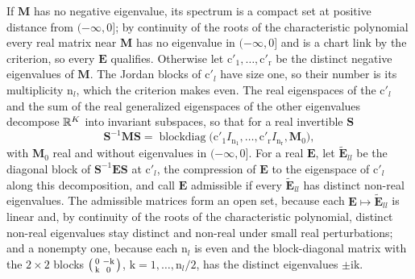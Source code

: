 If \(\mathbf M\) has no negative eigenvalue, its spectrum is a compact set at positive distance from
\((-\infty,0]\); by continuity of the roots of the characteristic polynomial every real matrix near
\(\mathbf M\) has no eigenvalue in \((-\infty,0]\) and is a chart link by the criterion, so every
\(\mathbf E\) qualifies. Otherwise let \(\mathrm c'_1,\ldots,\mathrm c'_{\mathrm r}\) be the distinct negative
eigenvalues of \(\mathbf M\). The Jordan blocks of \(\mathrm c'_l\) have size one, so their number is its
multiplicity \(\mathrm n_l\), which the criterion makes even. The real eigenspaces of the \(\mathrm c'_l\) and
the sum of the real generalized eigenspaces of the other eigenvalues decompose \(\mathbb R^K\) into invariant
subspaces, so that for a real invertible \(\mathbf S\)
\[
\mathbf S^{-1}\mathbf M\mathbf S=\operatorname{blockdiag}\bigl(\mathrm c'_1I_{\mathrm n_1},\ldots,\mathrm c'_{\mathrm r}I_{\mathrm n_{\mathrm r}},\mathbf M_0\bigr),
\]
with \(\mathbf M_0\) real and without eigenvalues in \((-\infty,0]\). For a real \(\mathbf E\), let
\(\widetilde{\mathbf E}_{ll}\) be the diagonal block of \(\mathbf S^{-1}\mathbf E\mathbf S\) at \(\mathrm c'_l\), the
compression of \(\mathbf E\) to the eigenspace of \(\mathrm c'_l\) along this decomposition, and call
\(\mathbf E\) admissible if every \(\widetilde{\mathbf E}_{ll}\) has distinct non-real eigenvalues. The
admissible matrices form an open set, because each \(\mathbf E\mapsto\widetilde{\mathbf E}_{ll}\) is linear
and, by continuity of the roots of the characteristic polynomial, distinct non-real eigenvalues stay
distinct and non-real under small real perturbations; and a nonempty one, because each \(\mathrm n_l\) is
even and the block-diagonal matrix with the \(2\times2\) blocks
\(\begin{psmallmatrix}0&-\mathrm k\\\mathrm k&0\end{psmallmatrix}\), \(\mathrm k=1,\ldots,\mathrm n_l/2\), has
the distinct eigenvalues \(\pm\mathrm i\mathrm k\).

